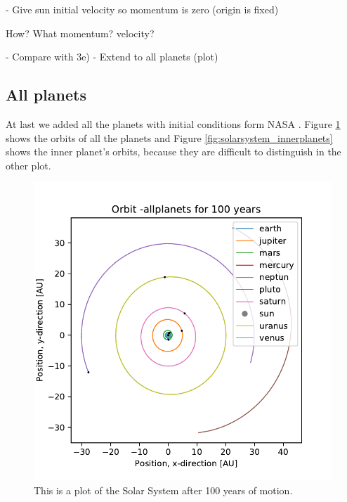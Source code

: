 	- Give sun initial velocity so momentum is zero (origin is fixed)

	How? What momentum? velocity?	
	
	- Compare with 3e)
	- Extend to all planets (plot)
	
	
\subsection{All planets}

At last we added all the planets with initial conditions form NASA \cite{nasa}. Figure \ref{fig:solarsystem_allplanets} shows the orbits of all the planets and Figure \ref{fig:solarsystem_innerplanets} shows the inner planet's orbits, because they are difficult to distinguish in the other plot.  

\begin{figure}[H]
\includegraphics[width=1\linewidth]{../results/plots/plotof-earthjupiter-allplanets.pdf}\caption{This is a plot of the Solar System after 100 years of motion.}\label{fig:solarsystem_allplanets}
\end{figure}


